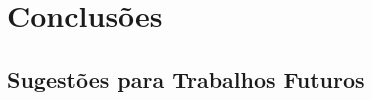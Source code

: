 \chapter{Conclusões}\label{conclusoes}



\section{Sugestões para Trabalhos Futuros}\label{sugestoes}
